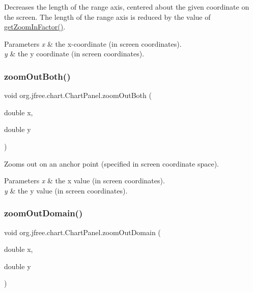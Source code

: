 Decreases the length of the range axis, centered about the given coordinate on the screen. The length of the range axis is reduced by the value of \mbox{\hyperlink{classorg_1_1jfree_1_1chart_1_1_chart_panel_a43dfc4192b55821224ea51b414f7494c}{get\+Zoom\+In\+Factor()}}.


\begin{DoxyParams}{Parameters}
{\em x} & the x-\/coordinate (in screen coordinates). \\
\hline
{\em y} & the y coordinate (in screen coordinates). \\
\hline
\end{DoxyParams}
\mbox{\label{classorg_1_1jfree_1_1chart_1_1_chart_panel_a87751a15d69cd4cead5bd85292d04909}} 
\subsubsection{\texorpdfstring{zoom\+Out\+Both()}{zoomOutBoth()}}
{\footnotesize\ttfamily void org.\+jfree.\+chart.\+Chart\+Panel.\+zoom\+Out\+Both (\begin{DoxyParamCaption}\item[{double}]{x,  }\item[{double}]{y }\end{DoxyParamCaption})}

Zooms out on an anchor point (specified in screen coordinate space).


\begin{DoxyParams}{Parameters}
{\em x} & the x value (in screen coordinates). \\
\hline
{\em y} & the y value (in screen coordinates). \\
\hline
\end{DoxyParams}
\mbox{\label{classorg_1_1jfree_1_1chart_1_1_chart_panel_ac825f01f37b6f74b37df0eba79ed256b}} 
\subsubsection{\texorpdfstring{zoom\+Out\+Domain()}{zoomOutDomain()}}
{\footnotesize\ttfamily void org.\+jfree.\+chart.\+Chart\+Panel.\+zoom\+Out\+Domain (\begin{DoxyParamCaption}\item[{double}]{x,  }\item[{double}]{y }\end{DoxyParamCaption})}

